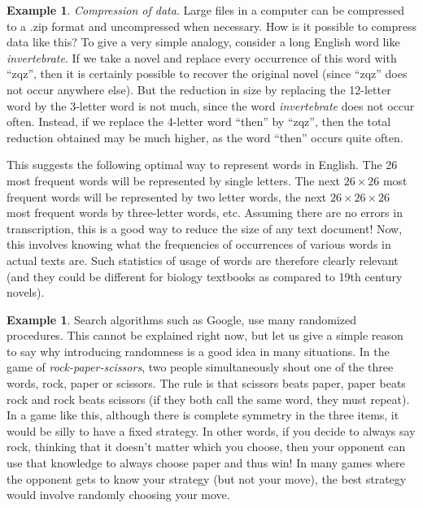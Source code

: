 \documentclass[preprint,  11pt]{amsart}
\theoremstyle{plain} %
\theoremstyle{definition} %
\newtheorem{example}[theorem]{Example}
\begin{document}
\begin{example}{\em Compression of data}. Large files in a computer can be compressed to a .zip format and uncompressed when necessary. How is it possible to compress data like this? To give a very simple analogy, consider a long English word like {\em invertebrate}. If we take a novel and replace every occurrence of this word with ``zqz'', then  it is certainly possible to recover the original novel (since ``zqz'' does not occur anywhere else). But the reduction in size by replacing the 12-letter word by the 3-letter word is not much, since the word {\em invertebrate} does not occur often. Instead, if we replace the 4-letter word ``then'' by ``zqz'', then the total reduction obtained may be much higher, as the word ``then'' occurs quite often. 

This suggests the following optimal way to represent words in English. The 26 most frequent words will be represented by single letters. The next $26\times 26$ most frequent words will be represented by two letter words, the next $26\times 26\times 26$ most frequent words by three-letter words, etc. Assuming there are no errors in transcription, this is a good way to reduce the size of any text document! Now, this involves knowing what the frequencies of occurrences of various words in actual texts are. Such statistics of usage of words are therefore clearly relevant (and they could be different for biology textbooks as compared to 19th century novels). 
\end{example}\begin{example}Search algorithms such as Google, use many randomized procedures. This cannot be explained right now, but let us give a simple reason to say why introducing randomness is a good idea in many situations. In the game of {\em rock-paper-scissors}, two people simultaneously shout one of the three words, rock, paper or scissors. The rule is that scissors beats paper, paper beats rock and rock beats scissors (if they both call the same word, they must repeat). In a game like this, although there is complete symmetry in the three items, it would be silly to have a fixed strategy. In other words, if you decide to always say rock, thinking that it doesn't matter which you choose, then your opponent can use that knowledge to always choose paper and thus win! In many games where the opponent gets to know your strategy (but not your move), the best strategy would involve  randomly choosing your move.
\end{example}
\end{document}
